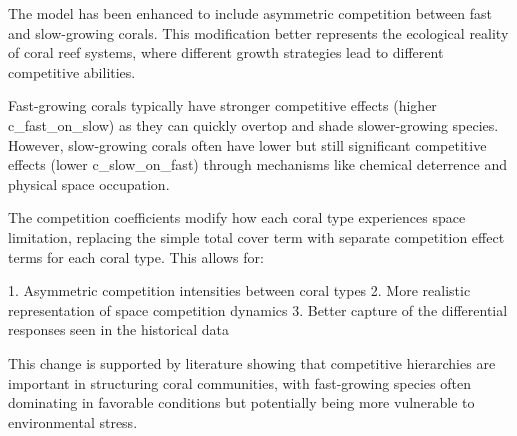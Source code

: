 The model has been enhanced to include asymmetric competition between fast and slow-growing corals. This modification better represents the ecological reality of coral reef systems, where different growth strategies lead to different competitive abilities.

Fast-growing corals typically have stronger competitive effects (higher c_fast_on_slow) as they can quickly overtop and shade slower-growing species. However, slow-growing corals often have lower but still significant competitive effects (lower c_slow_on_fast) through mechanisms like chemical deterrence and physical space occupation.

The competition coefficients modify how each coral type experiences space limitation, replacing the simple total cover term with separate competition effect terms for each coral type. This allows for:

1. Asymmetric competition intensities between coral types
2. More realistic representation of space competition dynamics
3. Better capture of the differential responses seen in the historical data

This change is supported by literature showing that competitive hierarchies are important in structuring coral communities, with fast-growing species often dominating in favorable conditions but potentially being more vulnerable to environmental stress.

